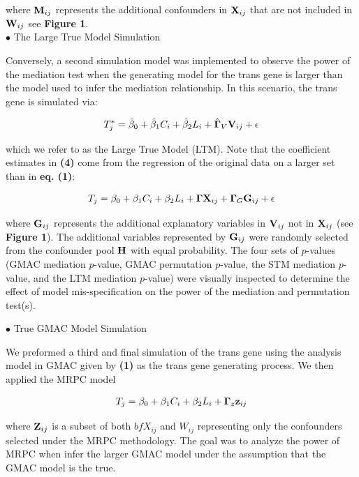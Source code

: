 \documentclass[
]{article}
\begin{document}
where \({\bf M}_{ij}\) represents the additional confounders in
\({\bf X}_{ij}\) that are not included in \({\bf W}_{ij}\) see
\textbf{Figure 1}.\\
\indent \(\bullet\) The Large True Model Simulation

Conversely, a second simulation model was implemented to observe the
power of the mediation test when the generating model for the trans gene
is larger than the model used to infer the mediation relationship. In
this scenario, the trans gene is simulated via:

\begin{eqnarray} T^{\ast}_{j} = \hat{\beta}_0+\hat{\beta}_1C_i + \hat{\beta}_2L_i + \hat{{\bf \Gamma}}_V{\bf V}_{ij} +\epsilon  \end{eqnarray}

which we refer to as the Large True Model (LTM). Note that the
coefficient estimates in \textbf{(4)} come from the regression of the
original data on a larger set than in \textbf{eq. (1)}:

\begin{eqnarray} T_{j} = \beta_0+\beta_1C_i + \beta_2L_i + {\bf\Gamma} {\bf X}_{ij} + {\bf \Gamma}_{G}{\bf G}_{ij} +\epsilon \end{eqnarray}

where \({\bf G}_{ij}\) represents the additional explanatory variables
in \({\bf V}_{ij}\) not in \({\bf X}_{ij}\) (see \textbf{Figure 1}). The
additional variables represented by \({\bf G}_{ij}\) were randomly
selected from the confounder pool \({\bf H}\) with equal probability.
The four sets of \(p\)-values (GMAC mediation \(p\)-value, GMAC
permutation \(p\)-value, the STM mediation \(p\)-value, and the LTM
mediation \(p\)-value) were visually inspected to determine the effect
of model mis-specification on the power of the mediation and permutation
test(s).

\indent \(\bullet\) True GMAC Model Simulation

We preformed a third and final simulation of the trans gene using the
analysis model in GMAC given by \textbf{(1)} as the trans gene
generating process. We then applied the MRPC model

\begin{eqnarray}  T_j = \beta_0 + \beta_1 C_i +\beta_2 L_i + {\bf \Gamma}_z {\bf z}_{ij} \end{eqnarray}

where \({\bf Z}_{ij}\) is a subset of both \({bf X}_{ij}\) and
\({W}_{ij}\) representing only the confounders selected under the MRPC
methodology. The goal was to analyze the power of MRPC when infer the
larger GMAC model under the assumption that the GMAC model is the true.
\end{document}
